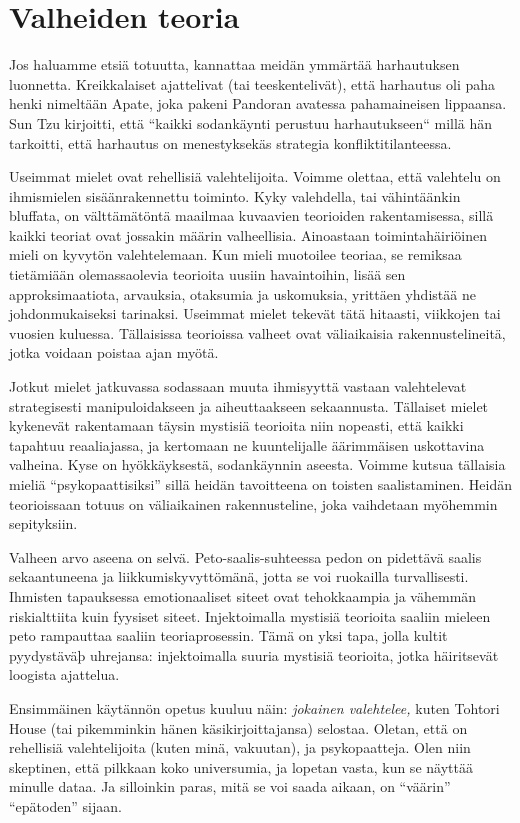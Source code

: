 \section{Valheiden teoria}

Jos haluamme etsiä totuutta, kannattaa meidän ymmärtää harhautuksen luonnetta. Kreikkalaiset ajattelivat (tai teeskentelivät), että harhautus oli paha henki nimeltään Apate, joka pakeni Pandoran avatessa pahamaineisen lippaansa. Sun Tzu kirjoitti, että ``kaikki sodankäynti perustuu harhautukseen\vmq{,}`` millä hän tarkoitti, että harhautus on menestyksekäs strategia konfliktitilanteessa.

Useimmat mielet ovat rehellisiä valehtelijoita. Voimme olettaa, että valehtelu on ihmismielen sisäänrakennettu toiminto. Kyky valehdella, tai vähintäänkin bluffata, on välttämätöntä maailmaa kuvaavien teorioiden rakentamisessa, sillä kaikki teoriat ovat jossakin määrin valheellisia. Ainoastaan toimintahäiriöinen mieli on kyvytön valehtelemaan. Kun mieli muotoilee teoriaa, se remiksaa tietämiään olemassaolevia teorioita uusiin havaintoihin, lisää sen approksimaatiota, arvauksia, otaksumia ja uskomuksia, yrittäen yhdistää ne johdonmukaiseksi tarinaksi. Useimmat mielet tekevät tätä hitaasti, viikkojen tai vuosien kuluessa. Tällaisissa teorioissa valheet ovat väliaikaisia rakennustelineitä, jotka voidaan poistaa ajan myötä.

Jotkut mielet jatkuvassa sodassaan muuta ihmisyyttä vastaan valehtelevat strategisesti manipuloidakseen ja aiheuttaakseen sekaannusta. Tällaiset mielet kykenevät rakentamaan täysin mystisiä teorioita niin nopeasti, että kaikki tapahtuu reaaliajassa, ja kertomaan ne kuuntelijalle äärimmäisen uskottavina valheina. Kyse on hyökkäyksestä, sodankäynnin aseesta. Voimme kutsua tällaisia mieliä ``psykopaattisiksi\vmq{,}'' sillä heidän tavoitteena on toisten saalistaminen. Heidän teorioissaan totuus on väliaikainen rakennusteline, joka vaihdetaan myöhemmin sepityksiin.

Valheen arvo aseena on selvä. Peto-saalis-suhteessa pedon on pidettävä saalis sekaantuneena ja liikkumiskyvyttömänä, jotta se voi ruokailla turvallisesti. Ihmisten tapauksessa emotionaaliset siteet ovat tehokkaampia ja vähemmän riskialttiita kuin fyysiset siteet. Injektoimalla mystisiä teorioita saaliin mieleen peto rampauttaa saaliin teoriaprosessin. Tämä on yksi tapa, jolla kultit pyydystäväþ uhrejansa: injektoimalla suuria mystisiä teorioita, jotka häiritsevät loogista ajattelua.

Ensimmäinen käytännön opetus kuuluu näin: \emph{jokainen valehtelee,} kuten Tohtori House (tai pikemminkin hänen käsikirjoittajansa) selostaa. Oletan, että on rehellisiä valehtelijoita (kuten minä, vakuutan), ja psykopaatteja. Olen niin skeptinen, että pilkkaan koko universumia, ja lopetan vasta, kun se näyttää minulle dataa. Ja silloinkin paras, mitä se voi saada aikaan, on ``väärin'' ``epätoden'' sijaan.

